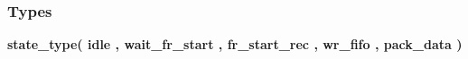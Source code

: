 \subsubsection*{Types}
 \begin{DoxyCompactItemize}
\item 
{\bfseries {\bf state\+\_\+type}{\bfseries \textcolor{vhdlchar}{(}\textcolor{vhdlchar}{ }\textcolor{vhdlchar}{idle}\textcolor{vhdlchar}{ }\textcolor{vhdlchar}{,}\textcolor{vhdlchar}{ }\textcolor{vhdlchar}{wait\+\_\+fr\+\_\+start}\textcolor{vhdlchar}{ }\textcolor{vhdlchar}{,}\textcolor{vhdlchar}{ }\textcolor{vhdlchar}{fr\+\_\+start\+\_\+rec}\textcolor{vhdlchar}{ }\textcolor{vhdlchar}{,}\textcolor{vhdlchar}{ }\textcolor{vhdlchar}{wr\+\_\+fifo}\textcolor{vhdlchar}{ }\textcolor{vhdlchar}{,}\textcolor{vhdlchar}{ }\textcolor{vhdlchar}{pack\+\_\+data}\textcolor{vhdlchar}{ }\textcolor{vhdlchar}{)}\textcolor{vhdlchar}{ }}} 
\end{DoxyCompactItemize}
